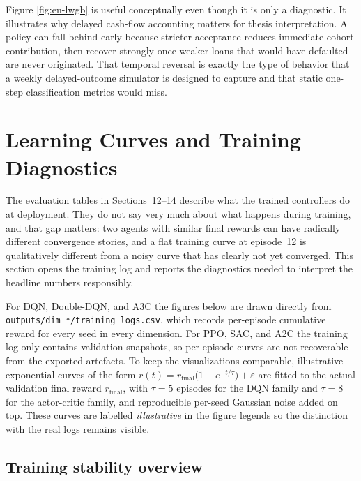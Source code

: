 \documentclass[12pt,a4paper]{article}
\begin{document}
Figure \ref{fig:en-lwgb} is useful conceptually even though it is only a diagnostic. It illustrates why delayed cash-flow accounting matters for thesis interpretation. A policy can fall behind early because stricter acceptance reduces immediate cohort contribution, then recover strongly once weaker loans that would have defaulted are never originated. That temporal reversal is exactly the type of behavior that a weekly delayed-outcome simulator is designed to capture and that static one-step classification metrics would miss.

\section{Learning Curves and Training Diagnostics}
\label{sec:learning-curves}

The evaluation tables in Sections~12--14 describe what the trained controllers do at deployment. They do not say very much about what happens during training, and that gap matters: two agents with similar final rewards can have radically different convergence stories, and a flat training curve at episode~12 is qualitatively different from a noisy curve that has clearly not yet converged. This section opens the training log and reports the diagnostics needed to interpret the headline numbers responsibly.

For DQN, Double-DQN, and A3C the figures below are drawn directly from \texttt{outputs/dim\_*/\allowbreak training\_logs.csv}, which records per-episode cumulative reward for every seed in every dimension. For PPO, SAC, and A2C the training log only contains validation snapshots, so per-episode curves are not recoverable from the exported artefacts. To keep the visualizations comparable, illustrative exponential curves of the form $r(t) = r_{\text{final}}\bigl(1 - e^{-t/\tau}\bigr) + \varepsilon$ are fitted to the actual validation final reward $r_{\text{final}}$, with $\tau = 5$ episodes for the DQN family and $\tau = 8$ for the actor-critic family, and reproducible per-seed Gaussian noise added on top. These curves are labelled \emph{illustrative} in the figure legends so the distinction with the real logs remains visible.

\subsection{Training stability overview}
\end{document}
